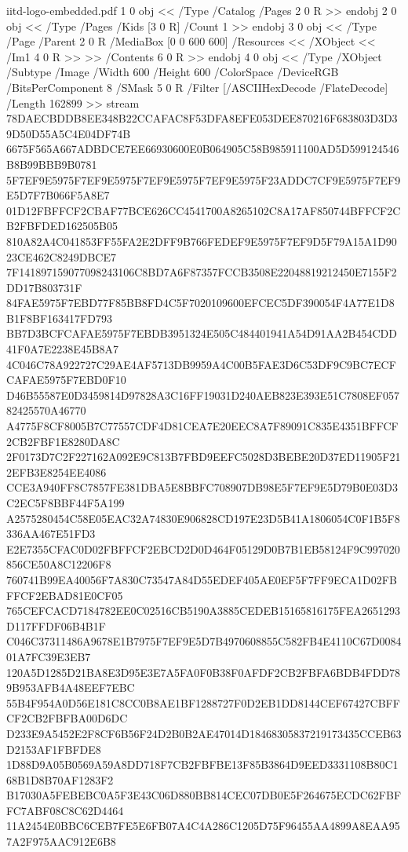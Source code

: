 \begin{filecontents*}[overwrite]{iitd-logo-embedded.pdf}
1 0 obj
<< /Type /Catalog /Pages 2 0 R >>
endobj
2 0 obj
<< /Type /Pages /Kids [3 0 R] /Count 1 >>
endobj
3 0 obj
<< /Type /Page /Parent 2 0 R /MediaBox [0 0 600 600] /Resources << /XObject << /Im1 4 0 R >> >> /Contents 6 0 R >>
endobj
4 0 obj
<< /Type /XObject /Subtype /Image /Width 600 /Height 600 /ColorSpace /DeviceRGB /BitsPerComponent 8 /SMask 5 0 R /Filter [/ASCIIHexDecode /FlateDecode] /Length 162899 >>
stream
78DAECBDDB8EE348B22CCAFAC8F53DFA8EFE053DEE870216F683803D3D39D50D55A5C4E04DF74B
6675F565A667ADBDCE7EE66930600E0B064905C58B985911100AD5D599124546B8B99BBB9B0781
5F7EF9E5975F7EF9E5975F7EF9E5975F7EF9E5975F23ADDC7CF9E5975F7EF9E5D7F7B066F5A8E7
01D12FBFFCF2CBAF77BCE626CC4541700A8265102C8A17AF850744BFFCF2CB2FBFDED162505B05
810A82A4C041853FF55FA2E2DFF9B766FEDEF9E5975F7EF9D5F79A15A1D9023CE462C8249DBCE7
7F141897159077098243106C8BD7A6F87357FCCB3508E22048819212450E7155F2DD17B803731F
84FAE5975F7EBD77F85BB8FD4C5F7020109600EFCEC5DF390054F4A77E1D8B1F8BF163417FD793
BB7D3BCFCAFAE5975F7EBDB3951324E505C484401941A54D91AA2B454CDD41F0A7E2238E45B8A7
4C046C78A922727C29AE4AF5713DB9959A4C00B5FAE3D6C53DF9C9BC7ECFCAFAE5975F7EBD0F10
D46B55587E0D3459814D97828A3C16FF19031D240AEB823E393E51C7808EF05782425570A46770
A4775F8CF8005B7C77557CDF4D81CEA7E20EEC8A7F89091C835E4351BFFCF2CB2FBF1E8280DA8C
2F0173D7C2F227162A092E9C813B7FBD9EEFC5028D3BEBE20D37ED11905F212EFB3E8254EE4086
CCE3A940FF8C7857FE381DBA5E8BBFC708907DB98E5F7EF9E5D79B0E03D3C2EC5F8BBF44F5A199
A2575280454C58E05EAC32A74830E906828CD197E23D5B41A1806054C0F1B5F8336AA467E51FD3
E2E7355CFAC0D02FBFFCF2EBCD2D0D464F05129D0B7B1EB58124F9C997020856CE50A8C12206F8
760741B99EA40056F7A830C73547A84D55EDEF405AE0EF5F7FF9ECA1D02FBFFCF2EBAD81E0CF05
765CEFCACD7184782EE0C02516CB5190A3885CEDEB15165816175FEA2651293D117FFDF06B4B1F
C046C37311486A9678E1B7975F7EF9E5D7B4970608855C582FB4E4110C67D008401A7FC39E3EB7
120A5D1285D21BA8E3D95E3E7A5FA0F0B38F0AFDF2CB2FBFA6BDB4FDD789B953AFB4A48EEF7EBC
55B4F954A0D56E181C8CC0B8AE1BF1288727F0D2EB1DD8144CEF67427CBFFCF2CB2FBFBA00D6DC
D233E9A5452E2F8CF6B56F24D2B0B2AE47014D18468305837219173435CCEB63D2153AF1FBFDE8
1D88D9A05B0569A59A8DD718F7CB2FBFBE13F85B3864D9EED3331108B80C168B1D8B70AF1283F2
B17030A5FEBEBC0A5F3E43C06D880BB814CEC07DB0E5F264675ECDC62FBFFC7ABF08C8C62D4464
11A2454E0BBC6CEB7FE5E6FB07A4C4A286C1205D75F96455AA4899A8EAA957A2F975AAC912E6B8

\end{filecontents*}
